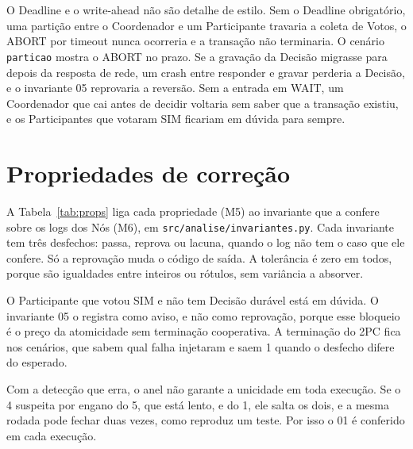 \documentclass[conference]{IEEEtran}
\newcommand{\cod}[1]{\texttt{\upshape #1}}
\begin{document}
O Deadline e o write-ahead não são detalhe de estilo. Sem o Deadline obrigatório, uma partição
entre o Coordenador e um Participante travaria a coleta de Votos, o ABORT por timeout nunca ocorreria e a transação não
terminaria. O cenário \cod{2pc particao} mostra o ABORT no prazo. Se a gravação da Decisão migrasse
para depois da resposta de rede, um crash entre responder e gravar perderia a Decisão, e o
invariante 05 reprovaria a reversão. Sem a entrada em WAIT, um Coordenador que cai antes de decidir
voltaria sem saber que a transação existiu, e os Participantes que votaram SIM ficariam em dúvida
para sempre.

\section{Propriedades de correção}
\label{sec:props}
A Tabela~\ref{tab:props} liga cada propriedade (M5) ao invariante que a confere sobre os logs dos
Nós (M6), em \cod{src/analise/invariantes.py}. Cada invariante tem três desfechos: passa, reprova
ou lacuna, quando o log não tem o caso que ele confere. Só a reprovação muda o código de saída. A
tolerância é zero em todos, porque são igualdades entre inteiros ou rótulos, sem variância a
absorver.

O Participante que votou SIM e não tem Decisão durável está em dúvida. O invariante 05 o registra
como aviso, e não como reprovação, porque esse bloqueio é o preço da atomicidade sem terminação
cooperativa. A terminação do 2PC fica nos cenários, que sabem qual falha injetaram e saem 1 quando
o desfecho difere do esperado.

Com a detecção que erra, o anel não garante a unicidade em toda execução. Se o 4 suspeita por
engano do 5, que está lento, e do 1, ele salta os dois, e a mesma rodada pode fechar duas vezes,
como reproduz um teste. Por isso o 01 é conferido em cada execução.
\end{document}
